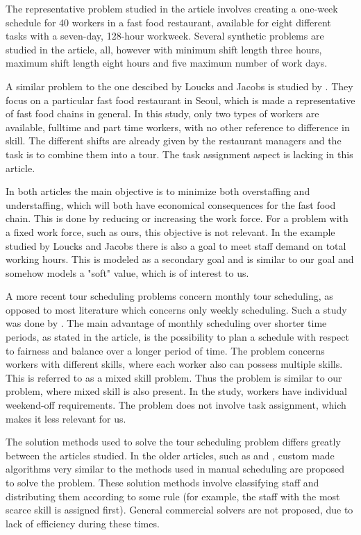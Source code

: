 The representative problem studied in the article involves creating a one-week schedule for 40 workers in a fast food restaurant, available for eight different tasks with a seven-day, 128-hour workweek. Several synthetic problems are studied in the article, all, however with minimum shift length three hours, maximum shift length eight hours and five maximum number of work days.

A similar problem to the one descibed by Loucks and Jacobs is studied by \citet{choi_hwang_park_2009}. They focus on a particular fast food restaurant in Seoul, which is made a representative of fast food chains in general. In this study, only two types of workers are available, fulltime and part time workers, with no other reference to difference in skill. The different shifts are already given by the restaurant managers and the task is to combine them into a tour. The task assignment aspect is lacking in this article.


In both articles the main objective is to minimize both overstaffing and understaffing, which will both have economical consequences for the fast food chain. This is done by reducing or increasing the work force. For a problem with a fixed work force, such as ours, this objective is not relevant. In the example studied by Loucks and Jacobs there is also a goal to meet staff demand on total working hours. This is modeled as a secondary goal and is similar to our goal and somehow models a "soft" value, which is of interest to us.

A more recent tour scheduling problems concern monthly tour scheduling, as opposed to most literature which concerns only weekly scheduling. Such a study was done by \citet{rong_2010}. The main advantage of monthly scheduling over shorter time periods, as stated in the article, is the possibility to plan a schedule with respect to fairness and balance over a longer period of time. The problem concerns workers with different skills, where each worker also can possess multiple skills. This is referred to as a mixed skill problem. Thus the problem is similar to our problem, where mixed skill is also present. In the study, workers have individual weekend-off requirements. The problem does not involve task assignment, which makes it less relevant for us.

The solution methods used to solve the tour scheduling problem differs greatly between the articles studied. In the older articles, such as \citet{thompson_1988} and \citet{loucks_1991}, custom made algorithms very similar to the methods used in manual scheduling are proposed to solve the problem. These solution methods involve classifying staff and distributing them according to some rule (for example, the staff with the most scarce skill is assigned first). General commercial solvers are not proposed, due to lack of efficiency during these times. 

